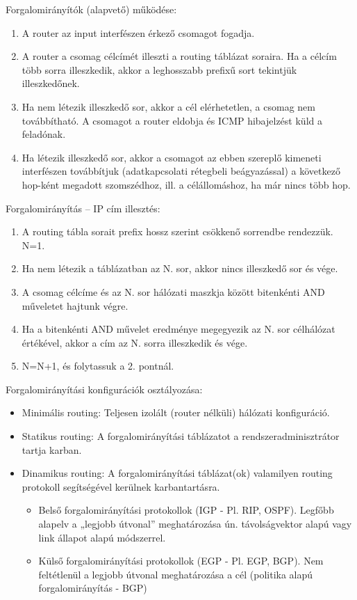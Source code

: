 Forgalomirányítók (alapvető) működése:
\begin{enumerate}[nosep]
	\item A router az input interfészen érkező csomagot fogadja.
	\item A router a csomag célcímét illeszti a routing táblázat soraira. Ha a célcím több sorra illeszkedik, akkor a leghosszabb prefixű sort tekintjük illeszkedőnek.
	\item Ha nem létezik illeszkedő sor, akkor a cél elérhetetlen, a csomag nem továbbítható. A csomagot a router eldobja és ICMP hibajelzést küld a feladónak.
	\item Ha létezik illeszkedő sor, akkor a csomagot az ebben szereplő kimeneti interfészen továbbítjuk (adatkapcsolati rétegbeli beágyazással) a következő hop-ként megadott szomszédhoz, ill. a célállomáshoz, ha már nincs több hop.
\end{enumerate}

Forgalomirányítás – IP cím illesztés:
\begin{enumerate}[nosep]
	\item A routing tábla sorait prefix hossz szerint csökkenő sorrendbe rendezzük. N=1. 
	\item Ha nem létezik a táblázatban az N. sor, akkor nincs illeszkedő sor és vége.
	\item A csomag célcíme és az N. sor hálózati maszkja között bitenkénti AND műveletet hajtunk végre.
	\item Ha a bitenkénti AND művelet eredménye megegyezik az N. sor célhálózat értékével, akkor a cím az N. sorra illeszkedik és vége.
	\item N=N+1, és folytassuk a 2. pontnál.
\end{enumerate}

Forgalomirányítási konfigurációk osztályozása:
\begin{itemize}[nosep]
	\item Minimális routing: Teljesen izolált (router nélküli) hálózati konfiguráció.
	\item Statikus routing: A forgalomirányítási táblázatot a rendszeradminisztrátor tartja karban.
	\item Dinamikus routing: A forgalomirányítási táblázat(ok) valamilyen routing protokoll segítségével kerülnek karbantartásra.
	\begin{itemize}[nosep]
		\item Belső forgalomirányítási protokollok (IGP - Pl. RIP, OSPF). Legfőbb alapelv a „legjobb útvonal” meghatározása ún. távolságvektor alapú vagy link állapot alapú módszerrel.
		\item  Külső forgalomirányítási protokollok (EGP - Pl. EGP, BGP). Nem feltétlenül a legjobb útvonal meghatározása a cél (politika alapú forgalomirányítás - BGP)
	\end{itemize}
\end{itemize}

